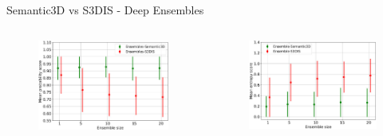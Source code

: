 \documentclass[aspectratio=169]{beamer}
\begin{document}
\begin{frame}{Semantic3D vs S3DIS - Deep Ensembles}
    \begin{columns}
        \begin{column}{0.5\textwidth}
            \begin{figure}
                \centering
                \includegraphics[scale=0.28]{images/ood1/MSP_Mean_OOD1_DE.jpg}
            \end{figure}
        \end{column}
        \begin{column}{0.5\textwidth}
            \begin{figure}
                \centering
                \includegraphics[scale=0.28]{images/ood1/Ent_Mean_OOD1_DE.jpg}
            \end{figure}
        \end{column}
    \end{columns}
\end{frame}
\end{document}
